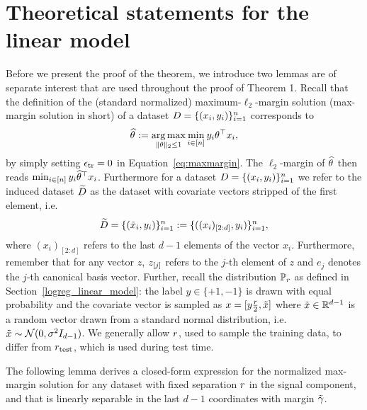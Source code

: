 \section{Theoretical statements for the linear model}

\label{sec:app_theorylinear}
Before we present the proof of the theorem, we introduce two lemmas are of separate interest that are used throughout the proof of Theorem 1. Recall that the definition of the (standard normalized) maximum-$\ell_2$-margin solution (max-margin solution in short) of a dataset $D =\{(x_i, y_i)\}_{i=1}^n$ corresponds to
\begin{equation}
  \label{eq:stdmaxmargin}
  \widehat{\theta}^{} := \operatorname*{arg\,max}_{\|\theta\|_2\leq 1} \min_{i\in [n]} y_i \theta^\top x_i,
\end{equation}
by simply setting $\epsilon_{\text{tr}} = 0$ in Equation~\eqref{eq:maxmargin}. The $\ell_2$-margin of $\widehat{\theta}^{}$ then reads $\min_{i\in[n]} y_i \widehat{\theta}^{\top} x_i$. Furthermore for a dataset $D = \{(x_i, y_i)\}_{i=1}^n$ we refer to the induced dataset $\widetilde{D}$ as the dataset with covariate vectors stripped of the first element, i.e.
\begin{equation}
  \widetilde{D} = \{(\tilde{x}_i, y_i)\}_{i=1}^n :=  \{ ((x_i)_{[2:d]}, y_i) \}_{i=1}^n, 
\end{equation}
where $(x_i)_{[2:d]}$ refers to the last $d-1$ elements of the vector $x_i$. Furthermore, remember that for any vector $z$, ${z}_{[j]}$ refers to the $j$-th element of $z$ and $e_j$ denotes the $j$-th canonical basis vector.
Further, recall the distribution $\mathbb{P}_r$ as defined in
Section~\ref{logreg_linear_model}: the label $y \in \{+1, -1\}$ is
drawn with equal probability and the covariate vector is sampled as $x
= [y\frac{r}{2}, \tilde{x}]$ where $\tilde{x} \in \mathbb{R}^{d-1}$ is
a random vector drawn from a standard normal distribution,
i.e. $\tilde{x} \sim \mathcal{N}(0, \sigma^2 I_{d-1})$. We generally allow
$r$, used to sample the training data, to differ from $r_{\text{test}}$, which is
used during test time.

The following lemma derives a closed-form expression for the normalized max-margin solution for any dataset with fixed separation $r$ in the signal component, and that is linearly separable in the last $d-1$ coordinates with margin $\tilde{\gamma}$.

